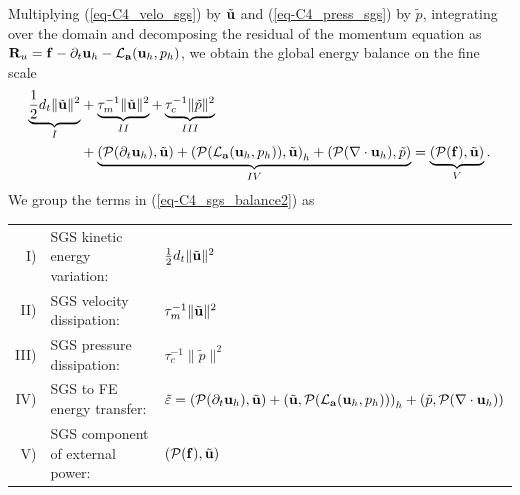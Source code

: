 Multiplying (\ref{eq-C4_velo_sgs}) by $\tilde{{\bf u}}$ and (\ref{eq-C4_press_sgs}) by $\tilde{p}$, integrating over the domain and decomposing the residual of the momentum equation as ${\bf R}_u={\bf f}-\partial_t{\bf u}_h-\mathcal{L}_{{\bf a}}({\bf u}_h,p_h)$, %
we obtain the global energy balance on the fine scale
\begin{align}
\label{eq-C4_sgs_balance2}
\underbrace{\frac{1}{2}d_t\|\tilde{{\bf u}}\|^2}_I
&+\underbrace{\tau_m^{-1}\|\tilde{{\bf u}}\|^2}_{II}
+\underbrace{\tau_c^{-1}\|\tilde{p}\|^2}_{III} \\ \nonumber
&+\underbrace{\left(\mathcal{P}(\partial_t{\bf u}_h),\tilde{{\bf u}}\right)
+\left(\mathcal{P}(\mathcal{L}_{{\bf a}}({\bf u}_h,p_h)),\tilde{{\bf u}}\right)_h
+\left(\mathcal{P}(\nabla\cdot{\bf u}_h),\tilde{p}\right)}_{IV}
=\underbrace{\left(\mathcal{P}({\bf f}),\tilde{{\bf u}}\right)}_V.
\end{align}
We group the terms in (\ref{eq-C4_sgs_balance2}) as
\begin{center}
\begin{tabular}{rll}
I)&SGS kinetic energy variation:&$\frac{1}{2}d_t\|\tilde{{\bf u}}\|^2$\\
II)&SGS velocity dissipation:&$\tau_m^{-1}\|\tilde{{\bf u}}\|^2$\\
III)&SGS pressure dissipation:&$\tau_c^{-1}\|\tilde{p}\|^2$\\
IV)&SGS to FE energy transfer:&$\tilde{\varepsilon}= \left(\mathcal{P}(\partial_t{\bf u}_h),\tilde{{\bf u}}\right)+\left(\tilde{{\bf u}},\mathcal{P}(\mathcal{L}_{{\bf a}}({\bf u}_h,p_h))\right)_h+\left(\tilde{p},\mathcal{P}(\nabla\cdot{\bf u}_h)\right)$\\
V)&SGS component of external power:&$\left(\mathcal{P}({\bf f}),\tilde{{\bf u}}\right)$\\
\end{tabular}
\end{center}
